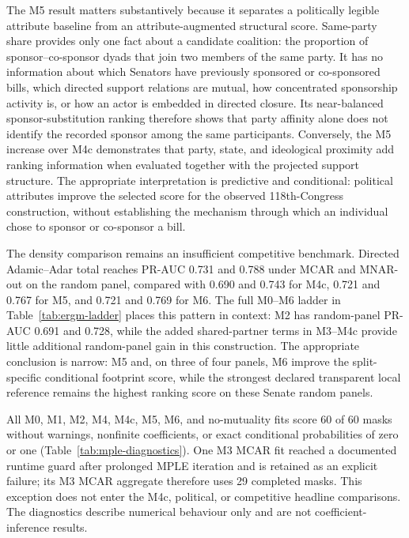 \documentclass{nws}
\begin{document}
The M5 result matters substantively because it separates a politically legible attribute baseline from an attribute-augmented structural score. Same-party share provides only one fact about a candidate coalition: the proportion of sponsor--co-sponsor dyads that join two members of the same party. It has no information about which Senators have previously sponsored or co-sponsored bills, which directed support relations are mutual, how concentrated sponsorship activity is, or how an actor is embedded in directed closure. Its near-balanced sponsor-substitution ranking therefore shows that party affinity alone does not identify the recorded sponsor among the same participants. Conversely, the M5 increase over M4c demonstrates that party, state, and ideological proximity add ranking information when evaluated together with the projected support structure. The appropriate interpretation is predictive and conditional: political attributes improve the selected score for the observed 118th-Congress construction, without establishing the mechanism through which an individual chose to sponsor or co-sponsor a bill.

The density comparison remains an insufficient competitive benchmark. Directed Adamic--Adar total reaches PR-AUC 0.731 and 0.788 under MCAR and MNAR-out on the random panel, compared with 0.690 and 0.743 for M4c, 0.721 and 0.767 for M5, and 0.721 and 0.769 for M6. The full M0--M6 ladder in Table~\ref{tab:ergm-ladder} places this pattern in context: M2 has random-panel PR-AUC 0.691 and 0.728, while the added shared-partner terms in M3--M4c provide little additional random-panel gain in this construction. The appropriate conclusion is narrow: M5 and, on three of four panels, M6 improve the split-specific conditional footprint score, while the strongest declared transparent local reference remains the highest ranking score on these Senate random panels.




All M0, M1, M2, M4, M4c, M5, M6, and no-mutuality fits score 60 of 60 masks without warnings, nonfinite coefficients, or exact conditional probabilities of zero or one (Table~\ref{tab:mple-diagnostics}). One M3 MCAR fit reached a documented runtime guard after prolonged MPLE iteration and is retained as an explicit failure; its M3 MCAR aggregate therefore uses 29 completed masks. This exception does not enter the M4c, political, or competitive headline comparisons. The diagnostics describe numerical behaviour only and are not coefficient-inference results.
\end{document}
